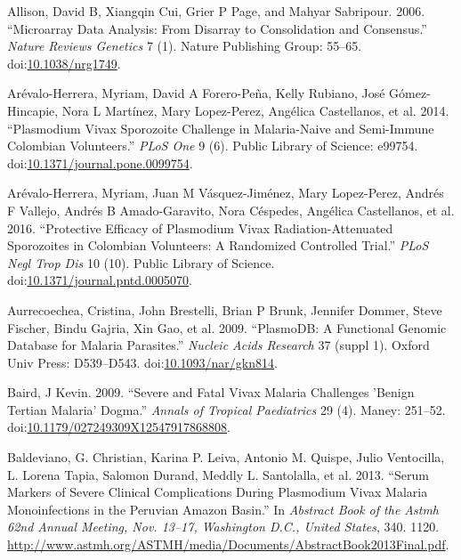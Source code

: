 \documentclass[a4paper]{article}
\begin{document}
\hypertarget{refs}{}
\hypertarget{ref-allison2006}{}
Allison, David B, Xiangqin Cui, Grier P Page, and Mahyar Sabripour.
2006. ``Microarray Data Analysis: From Disarray to Consolidation and
Consensus.'' \emph{Nature Reviews Genetics} 7 (1). Nature Publishing
Group: 55--65.
doi:\href{https://doi.org/10.1038/nrg1749}{10.1038/nrg1749}.

\hypertarget{ref-arevalo2014}{}
Arévalo-Herrera, Myriam, David A Forero-Peña, Kelly Rubiano, José
Gómez-Hincapie, Nora L Martínez, Mary Lopez-Perez, Angélica Castellanos,
et al. 2014. ``Plasmodium Vivax Sporozoite Challenge in Malaria-Naive
and Semi-Immune Colombian Volunteers.'' \emph{PLoS One} 9 (6). Public
Library of Science: e99754.
doi:\href{https://doi.org/10.1371/journal.pone.0099754}{10.1371/journal.pone.0099754}.

\hypertarget{ref-arevalo2016spz}{}
Arévalo-Herrera, Myriam, Juan M Vásquez-Jiménez, Mary Lopez-Perez,
Andrés F Vallejo, Andrés B Amado-Garavito, Nora Céspedes, Angélica
Castellanos, et al. 2016. ``Protective Efficacy of Plasmodium Vivax
Radiation-Attenuated Sporozoites in Colombian Volunteers: A Randomized
Controlled Trial.'' \emph{PLoS Negl Trop Dis} 10 (10). Public Library of
Science.
doi:\href{https://doi.org/10.1371/journal.pntd.0005070}{10.1371/journal.pntd.0005070}.

\hypertarget{ref-plasmodb}{}
Aurrecoechea, Cristina, John Brestelli, Brian P Brunk, Jennifer Dommer,
Steve Fischer, Bindu Gajria, Xin Gao, et al. 2009. ``PlasmoDB: A
Functional Genomic Database for Malaria Parasites.'' \emph{Nucleic Acids
Research} 37 (suppl 1). Oxford Univ Press: D539--D543.
doi:\href{https://doi.org/10.1093/nar/gkn814}{10.1093/nar/gkn814}.

\hypertarget{ref-baird2009}{}
Baird, J Kevin. 2009. ``Severe and Fatal Vivax Malaria Challenges
'Benign Tertian Malaria' Dogma.'' \emph{Annals of Tropical Paediatrics}
29 (4). Maney: 251--52.
doi:\href{https://doi.org/10.1179/027249309X12547917868808}{10.1179/027249309X12547917868808}.

\hypertarget{ref-baldevi2013}{}
Baldeviano, G. Christian, Karina P. Leiva, Antonio M. Quispe, Julio
Ventocilla, L. Lorena Tapia, Salomon Durand, Meddly L. Santolalla, et
al. 2013. ``Serum Markers of Severe Clinical Complications During
Plasmodium Vivax Malaria Monoinfections in the Peruvian Amazon Basin.''
In \emph{Abstract Book of the Astmh 62nd Annual Meeting, Nov. 13--17,
Washington D.C., United States}, 340. 1120.
\url{http://www.astmh.org/ASTMH/media/Documents/AbstractBook2013Final.pdf}.
\end{document}
